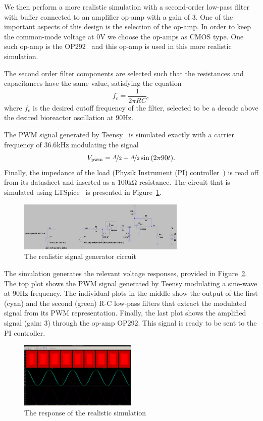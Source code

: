 We then perform a more realistic simulation with a second-order low-pass filter
with buffer connected to an amplifier op-amp with a gain of $3$. One of the
important aspects of this design is the selection of the op-amp. In order to
keep the common-mode voltage at $0$\unit{\volt} we choose the op-amps as CMOS
type. One such op-amp is the OP292~ and this op-amp is used in this
more realistic simulation.

The second order filter components are selected such that the resistances and
capacitances have the same value, satisfying the equation \[ f_c = \frac{1}{2\pi
RC}, \] where $f_c$ is the desired cutoff frequency of the filter, selected to
be a decade above the desired bioreactor oscillation at $90$\unit{\hertz}.

The PWM signal generated by Teensy~ is simulated exactly
with a carrier frequency of $36.6$\unit{\kilo\hertz} modulating the signal \[
V_{\text{pwm}} = \nicefrac{A}{2} + \nicefrac{A}{2}\sin{(2\pi 90 t)}.\] Finally,
the impedance of the load (Physik Instrument (PI) controller~) is
read off from its datasheet and inserted as a $100$\unit{\kilo\ohm} resistance.
The circuit that is simulated using LTSpice~ is presented in
Figure~\ref{fig:real_sig_gen}.

\begin{figure}[htb]
\includegraphics[width=8cm]{./figures/circuit.png}
\caption{The realistic signal generator circuit}
\label{fig:real_sig_gen}
\end{figure}

The simulation generates the relevant voltage responses, provided in
Figure~\ref{fig:response}. The top plot shows the PWM signal generated by Teensy
modulating a sine-wave at $90$\unit{\hertz} frequency. The individual plots in
the middle show the output of the first (cyan) and the second (green) R-C
low-pass filters that extract the modulated signal from its PWM representation.
Finally, the last plot shows the amplified signal (gain: $3$) through the op-amp
OP292. This signal is ready to be sent to the PI controller.

\begin{figure}[t]
\includegraphics[width=0.5\textwidth]{./figures/pwm_filtered_one_two_final_signal.png}
\caption{The response of the realistic simulation}
\label{fig:response}
\end{figure}
